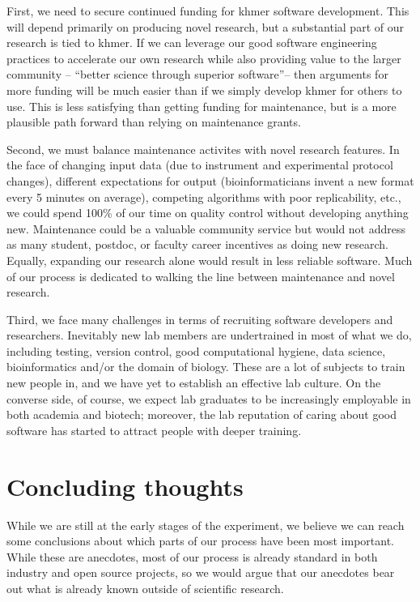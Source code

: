 \documentclass[12pt]{article}
\begin{document}
First, we need to secure continued funding for khmer software
development.  This will depend primarily on producing novel research,
but a substantial part of our research is tied to khmer.  If we can
leverage our good software engineering practices to accelerate our own
research while also providing value to the larger community --
``better science through superior software''-- then arguments for more
funding will be much easier than if we simply develop khmer for
others to use.  This is less satisfying than getting funding for maintenance,
but is a more plausible path forward than relying on maintenance grants.

Second, we must balance maintenance activites with novel research
features.  In the face of changing input data (due to instrument and
experimental protocol changes), different expectations for output
(bioinformaticians invent a new format every 5 minutes on average),
competing algorithms with poor replicability, etc., we could spend
100\% of our time on quality control without developing anything new.
Maintenance could be a valuable community service but would not address
as many student, postdoc, or faculty career incentives as doing new
research.  Equally, expanding our research alone would result in less
reliable software.  Much of our process is dedicated to walking the
line between maintenance and novel research.

Third, we face many challenges in terms of recruiting software
developers and researchers.  Inevitably new lab members are
undertrained in most of what we do, including testing, version
control, good computational hygiene, data science, bioinformatics
and/or the domain of biology.  These are a lot of subjects to train
new people in, and we have yet to establish an effective lab culture.
On the converse side, of course, we expect lab graduates to be
increasingly employable in both academia and biotech; moreover, the
lab reputation of caring about good software has started to attract
people with deeper training.

\section{Concluding thoughts}

While we are still at the early stages of the experiment, we believe
we can reach some conclusions about which parts of our process have
been most important.  While these are anecdotes, most of our process
is already standard in both industry and open source projects, so we
would argue that our anecdotes bear out what is already known outside
of scientific research.
\end{document}
